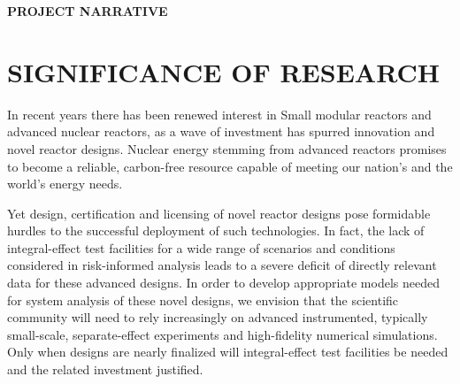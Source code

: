 \documentclass[11pt,letterpaper,english]{article}
\begin{document}
\setlength{\parindent}{0in} %

\pagestyle{fancy}   \renewcommand{%
\headrulewidth}{0.0pt}

\begin{center}
{\bf PROJECT NARRATIVE}
\end{center}

\vspace{-.15in}






\vspace{-.25in}
\section{SIGNIFICANCE OF RESEARCH}
\vspace{-.2in}

In recent years there has been renewed interest in Small modular reactors and advanced nuclear reactors, as a wave of investment has spurred innovation and novel reactor designs. Nuclear energy stemming from advanced reactors promises to become a reliable, carbon-free resource capable of meeting our nation's and the world's energy needs.

Yet design, certification and licensing of novel reactor designs pose formidable hurdles to the successful deployment of such technologies. In fact, the lack of integral-effect test facilities for a wide range of scenarios and conditions considered in risk-informed analysis leads to a severe deficit of directly relevant data for these advanced designs. In order to develop appropriate models needed for system analysis of these novel designs, we envision that the scientific community will need to rely increasingly on advanced instrumented, typically small-scale, separate-effect experiments and high-fidelity numerical simulations. Only when designs are nearly finalized will integral-effect test facilities be needed and the related investment justified.
\end{document}
